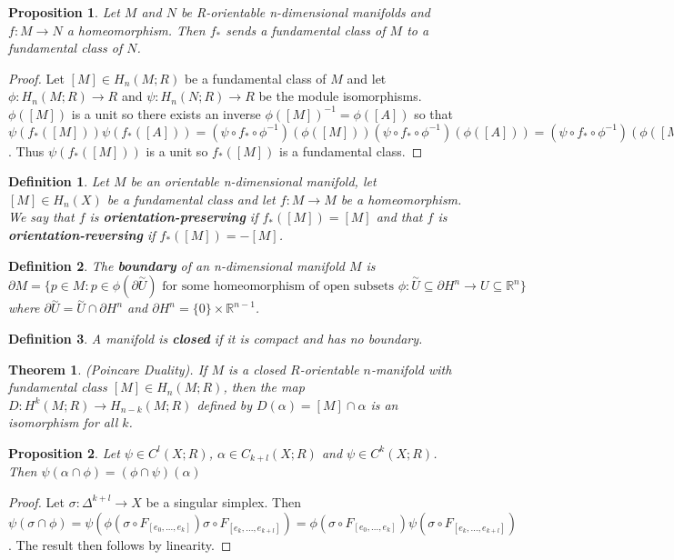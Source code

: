 \documentclass{report}
\newtheorem{definition}{Definition}
\newtheorem{theorem}{Theorem}
\newtheorem{proposition}{Proposition}
\begin{document}
\begin{proposition}
Let $M$ and $N$ be R-orientable n-dimensional manifolds and $f\colon M\to N$ a homeomorphism. Then $f_*$ sends a fundamental class of $M$ to a fundamental class of $N$.
\end{proposition}
\begin{proof}
Let $[M]\in H_n(M;R)$ be a fundamental class of $M$ and let $\phi\colon H_n(M;R)\to R$ and $\psi\colon H_n(N;R)\to R$ be the module isomorphisms. $\phi([M])$ is a unit so there exists an inverse $\phi([M])^{-1}=\phi([A])$ so that $\psi(f_*([M]))\psi(f_*([A]))=(\psi\circ f_*\circ \phi^{-1})(\phi([M]))(\psi\circ f_*\circ \phi^{-1})(\phi([A]))=(\psi\circ f_*\circ \phi^{-1})(\phi([M])\phi([A]))=(\psi\circ f_*\circ \phi^{-1})(1)=1$. Thus $\psi(f_*([M]))$ is a unit so $f_*([M])$ is a fundamental class.
\end{proof}

\begin{definition}
Let $M$ be an orientable n-dimensional manifold, let $[M]\in H_n(X)$ be a fundamental class and let $f\colon M\to M$ be a homeomorphism. We say that $f$ is \textbf{orientation-preserving} if $f_*([M])=[M]$ and that $f$ is \textbf{orientation-reversing} if $f_*([M])=-[M]$.
\end{definition}

\begin{definition}
The \textbf{boundary} of an n-dimensional manifold $M$ is $\partial M=\{p\in M:p\in\phi(\partial\overset{\sim}{U})\text{ for some homeomorphism of open subsets }\phi:\overset{\sim}{U}\subseteq\partial H^n\to U\subseteq \mathbb{R}^n\}$ where $\partial\overset{\sim}{U}=\overset{\sim}{U}\cap\partial H^n$ and $\partial H^n=\{0\}\times\mathbb{R}^{n-1}$.
\end{definition}

\begin{definition}
A manifold is \textbf{closed} if it is compact and has no boundary.
\end{definition}

\begin{theorem}
(Poincare Duality). If $M$ is a closed $R$-orientable $n$-manifold with fundamental class $[M]\in H_n(M;R)$, then the map $D\colon H^k(M;R)\to H_{n-k}(M;R)$ defined by $D(\alpha)=[M]\cap\alpha$ is an isomorphism for all $k$.
\end{theorem}

\begin{proposition}
Let $\psi\in C^l(X;R)$, $\alpha\in C_{k+l}(X;R)$ and $\psi\in C^k(X;R)$. Then $\psi(\alpha\cap\phi)=(\phi\cap\psi)(\alpha)$
\end{proposition}
\begin{proof}
Let $\sigma\colon\Delta^{k+l}\to X$ be a singular simplex. Then $\psi(\sigma\cap\phi)=\psi(\phi(\sigma\circ F_{[e_0,...,e_k]})\sigma\circ F_{[e_k,...,e_{k+l}]})=\phi(\sigma\circ F_{[e_0,...,e_k]})\psi(\sigma\circ F_{[e_k,...,e_{k+l}]})$.
The result then follows by linearity.
\end{proof}
\end{document}
